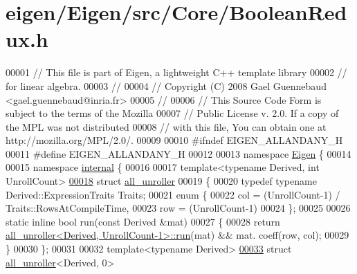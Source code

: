 \hypertarget{eigen_2_eigen_2src_2_core_2_boolean_redux_8h_source}{}\section{eigen/\+Eigen/src/\+Core/\+Boolean\+Redux.h}
\label{eigen_2_eigen_2src_2_core_2_boolean_redux_8h_source}

\begin{DoxyCode}
00001 \textcolor{comment}{// This file is part of Eigen, a lightweight C++ template library}
00002 \textcolor{comment}{// for linear algebra.}
00003 \textcolor{comment}{//}
00004 \textcolor{comment}{// Copyright (C) 2008 Gael Guennebaud <gael.guennebaud@inria.fr>}
00005 \textcolor{comment}{//}
00006 \textcolor{comment}{// This Source Code Form is subject to the terms of the Mozilla}
00007 \textcolor{comment}{// Public License v. 2.0. If a copy of the MPL was not distributed}
00008 \textcolor{comment}{// with this file, You can obtain one at http://mozilla.org/MPL/2.0/.}
00009 
00010 \textcolor{preprocessor}{#ifndef EIGEN\_ALLANDANY\_H}
00011 \textcolor{preprocessor}{#define EIGEN\_ALLANDANY\_H}
00012 
00013 \textcolor{keyword}{namespace }\hyperlink{namespace_eigen}{Eigen} \{ 
00014 
00015 \textcolor{keyword}{namespace }\hyperlink{namespaceinternal}{internal} \{
00016 
00017 \textcolor{keyword}{template}<\textcolor{keyword}{typename} Derived, \textcolor{keywordtype}{int} UnrollCount>
\hyperlink{struct_eigen_1_1internal_1_1all__unroller}{00018} \textcolor{keyword}{struct }\hyperlink{struct_eigen_1_1internal_1_1all__unroller}{all\_unroller}
00019 \{
00020   \textcolor{keyword}{typedef} \textcolor{keyword}{typename} Derived::ExpressionTraits Traits;
00021   \textcolor{keyword}{enum} \{
00022     col = (UnrollCount-1) / Traits::RowsAtCompileTime,
00023     row = (UnrollCount-1) %
00024   \};
00025 
00026   \textcolor{keyword}{static} \textcolor{keyword}{inline} \textcolor{keywordtype}{bool} run(\textcolor{keyword}{const} Derived &mat)
00027   \{
00028     \textcolor{keywordflow}{return} \hyperlink{struct_eigen_1_1internal_1_1all__unroller}{all\_unroller<Derived, UnrollCount-1>::run}(mat) && mat.
      coeff(row, col);
00029   \}
00030 \};
00031 
00032 \textcolor{keyword}{template}<\textcolor{keyword}{typename} Derived>
\hyperlink{struct_eigen_1_1internal_1_1all__unroller_3_01_derived_00_010_01_4}{00033} \textcolor{keyword}{struct }\hyperlink{struct_eigen_1_1internal_1_1all__unroller}{all\_unroller}<Derived, 0>

\end{DoxyCode}
